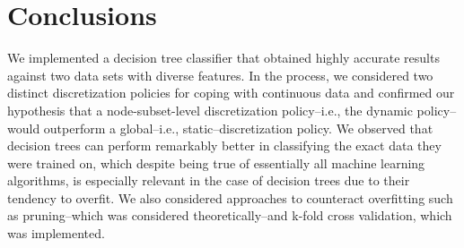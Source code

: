 \documentclass[12pt, conference, compsocconf]{IEEEtran}
\begin{document}
\section{Conclusions}
We implemented a decision tree classifier that obtained highly accurate results against two data sets with diverse features.
In the process, we considered two distinct discretization policies for coping with continuous data and confirmed our hypothesis that a node-subset-level discretization policy--i.e., the dynamic policy--would outperform a global--i.e., static--discretization policy. 
We observed that decision trees can perform remarkably better in classifying the exact data they were trained on, which despite being true of essentially all machine learning algorithms, is especially relevant in the case of decision trees due to their tendency to overfit.
We also considered approaches to counteract overfitting such as pruning--which was considered theoretically--and k-fold cross validation, which was implemented. 

%
%
\end{document}
